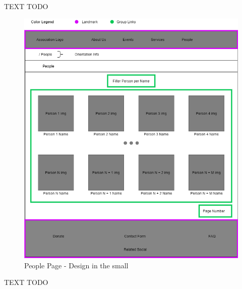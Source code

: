 TEXT TODO

\begin{figure}[h!]
		\centering
		\begin{minipage}[b]{1\textwidth}
    			\includegraphics[width=\textwidth]{./assets/people.png}
			\caption{People Page - Design in the small}
		\end{minipage}
	\end{figure}
	\FloatBarrier


TEXT TODO

